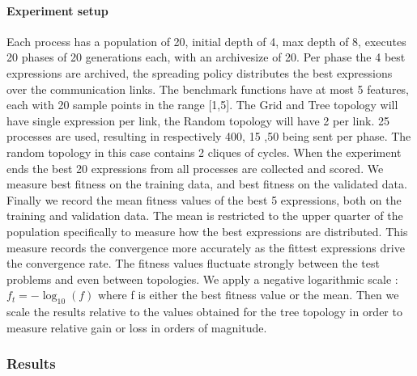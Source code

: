 \paragraph{Experiment setup}
Each process has a population of 20, initial depth of 4, max depth of 8, executes 20 phases of 20 generations each, with an archivesize of 20. Per phase the 4 best expressions are archived, the spreading policy distributes the best expressions over the communication links. The benchmark functions have at most 5 features, each with 20 sample points in the range [1,5]. The Grid and Tree topology will have single expression per link, the Random topology will have 2 per link. 25 processes are used, resulting in respectively 400, 15 ,50 being sent per phase. The random topology in this case contains 2 cliques of cycles.
When the experiment ends the best 20 expressions from all processes are collected and scored. We measure best fitness on the training data, and best fitness on the validated data. 
Finally we record the mean fitness values of the best 5 expressions, both on the training and validation data. The mean is restricted to the upper quarter of the population specifically to measure how the best expressions are distributed. This measure records the convergence more accurately as the fittest expressions drive the convergence rate. 
The fitness values fluctuate strongly between the test problems and even between topologies. We apply a negative logarithmic scale :
$
f_t = -\log_{10}(f)
$
where f is either the best fitness value or the mean. Then we scale the results relative to the values obtained for the tree topology in order to measure relative gain or loss in orders of magnitude.
\subsubsection{Results}
